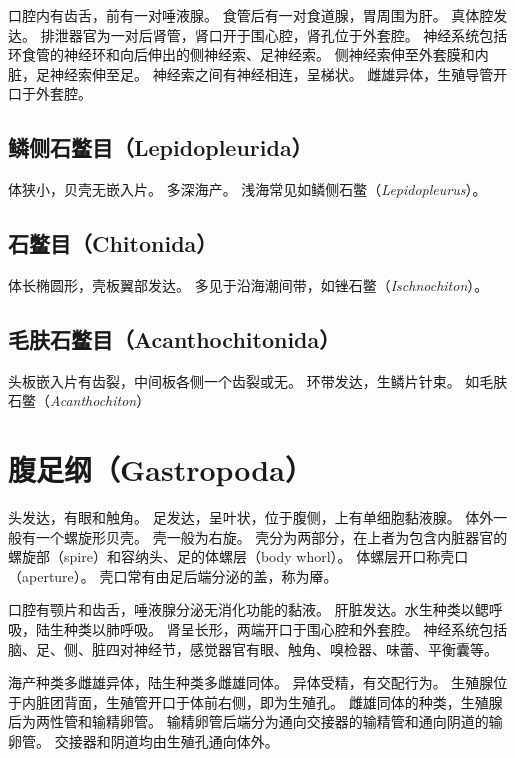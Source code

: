 \documentclass[11pt]{article}
\begin{document}
\newline
  
口腔内有齿舌，前有一对唾液腺。
食管后有一对食道腺，胃周围为肝。
真体腔发达。
排泄器官为一对后肾管，肾口开于围心腔，肾孔位于外套腔。
神经系统包括环食管的神经环和向后伸出的侧神经索、足神经索。
侧神经索伸至外套膜和内脏，足神经索伸至足。
神经索之间有神经相连，呈梯状。
雌雄异体，生殖导管开口于外套腔。
  
\subsection{鳞侧石鳖目（Lepidopleurida）}
体狭小，贝壳无嵌入片。
多深海产。
浅海常见如鳞侧石鳖（\textit{Lepidopleurus}）。

\subsection{石鳖目（Chitonida）}
体长椭圆形，壳板翼部发达。
多见于沿海潮间带，如锉石鳖（\textit{Ischnochiton}）。

\subsection{毛肤石鳖目（Acanthochitonida）}
头板嵌入片有齿裂，中间板各侧一个齿裂或无。
环带发达，生鳞片针束。
如毛肤石鳖（\textit{Acanthochiton}）

\section{腹足纲（Gastropoda）}
头发达，有眼和触角。
足发达，呈叶状，位于腹侧，上有单细胞黏液腺。
体外一般有一个螺旋形贝壳。
壳一般为右旋。
壳分为两部分，在上者为包含内脏器官的螺旋部（spire）和容纳头、足的体螺层（body whorl）。
体螺层开口称壳口（aperture）。
壳口常有由足后端分泌的盖，称为厣。

\newline

口腔有颚片和齿舌，唾液腺分泌无消化功能的黏液。
肝脏发达。水生种类以鳃呼吸，陆生种类以肺呼吸。
肾呈长形，两端开口于围心腔和外套腔。
神经系统包括脑、足、侧、脏四对神经节，感觉器官有眼、触角、嗅检器、味蕾、平衡囊等。

\newline

海产种类多雌雄异体，陆生种类多雌雄同体。
异体受精，有交配行为。
生殖腺位于内脏团背面，生殖管开口于体前右侧，即为生殖孔。
雌雄同体的种类，生殖腺后为两性管和输精卵管。
输精卵管后端分为通向交接器的输精管和通向阴道的输卵管。
交接器和阴道均由生殖孔通向体外。
  
\end{document}
